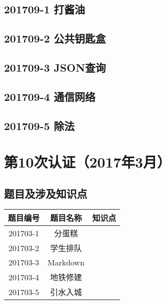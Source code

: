 \documentclass[cn,10pt,math=newtx,citestyle=gb7714-2015,bibstyle=gb7714-2015]{elegantbook}
\newif\ifonlyanalyze %
\begin{document}
\newpage
\section{201709-1 打酱油}
\ifonlyanalyze
\else
    
\fi


\newpage
\section{201709-2 公共钥匙盒}
\ifonlyanalyze
\else
    
\fi


\newpage
\section{201709-3 JSON查询}
\ifonlyanalyze
\else
    
\fi


\newpage
\section{201709-4 通信网络}
\ifonlyanalyze
\else
    
\fi


\newpage
\section{201709-5 除法}
\ifonlyanalyze
\else
    
\fi



\chapter{第10次认证（2017年3月）}

\section{题目及涉及知识点}

\begin{table}[htbp]
    \centering
    \begin{tabular}{ccc}
        \toprule
        题目编号 & 题目名称 & 知识点 \\
        \midrule
        201703-1 & 分蛋糕   &        \\
        201703-2 & 学生排队 &        \\
        201703-3 & Markdown &        \\
        201703-4 & 地铁修建 &        \\
        201703-5 & 引水入城 &        \\
        \bottomrule
    \end{tabular}
\end{table}
\end{document}
